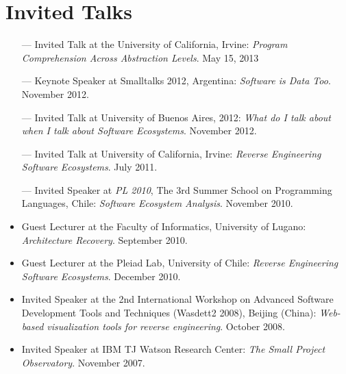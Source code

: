\section{Invited Talks}

\begin{itemize}
\item [---] Invited Talk at the University of California, Irvine: {\em Program Comprehension Across Abstraction Levels}. May 15, 2013
\item [---] Keynote Speaker at Smalltalks 2012, Argentina: {\em Software is Data Too}. November 2012.
\item [---] Invited Talk at University of Buenos Aires, 2012: {\em What do I talk about when I talk about Software Ecosystems}. November 2012.
\item [---] Invited Talk at University of California, Irvine: {\em Reverse Engineering Software Ecosystems}. July 2011.
\item [---] Invited Speaker at {\em PL 2010}, The 3rd Summer School on Programming Languages, Chile: {\em Software Ecosystem Analysis}. November 2010.
\item Guest Lecturer at the Faculty of Informatics, University of Lugano: {\em Architecture Recovery}. September 2010.
\item Guest Lecturer at the Pleiad Lab, University of Chile: {\em Reverse Engineering Software Ecosystems}. December 2010. 
\item Invited Speaker at the 2nd International Workshop on Advanced Software Development Tools and Techniques (Wasdett2 2008), Beijing (China): {\em Web-based visualization tools for reverse engineering}. October 2008.
\item Invited Speaker at IBM TJ Watson Research Center: {\em The Small Project Observatory}. November 2007.
\end{itemize}